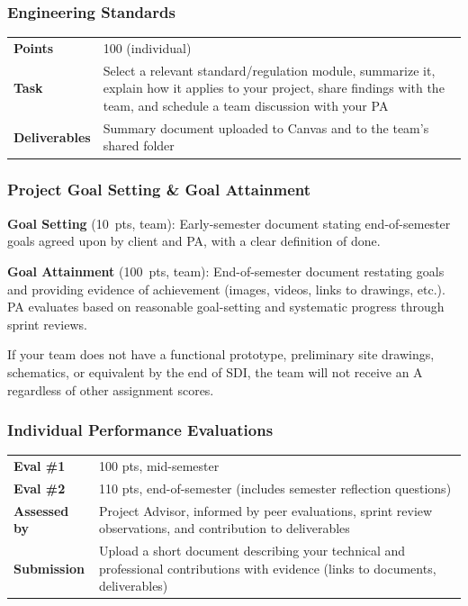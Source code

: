 \subsubsection{Engineering Standards}
\label{sssec:eng-standards}

\begin{tabularx}{\textwidth}{lX}
\toprule
\textbf{Points} & 100 (individual) \\
\textbf{Task} & Select a relevant standard/regulation module, summarize it, explain how it applies to your project, share findings with the team, and schedule a team discussion with your PA \\
\textbf{Deliverables} & Summary document uploaded to Canvas and to the team's shared folder \\
\bottomrule
\end{tabularx}

\subsubsection{Project Goal Setting \& Goal Attainment}
\label{sssec:goals}

\textbf{Goal Setting} (10~pts, team): Early-semester document stating end-of-semester goals agreed upon by client and PA, with a clear definition of done.

\textbf{Goal Attainment} (100~pts, team): End-of-semester document restating goals and providing evidence of achievement (images, videos, links to drawings, etc.). PA evaluates based on reasonable goal-setting and systematic progress through sprint reviews.

\begin{warnbox}
If your team does not have a functional prototype, preliminary site drawings, schematics, or equivalent by the end of SDI, the team will not receive an A regardless of other assignment scores.
\end{warnbox}

\subsubsection{Individual Performance Evaluations}
\label{sssec:ipe-sdi}

\begin{tabularx}{\textwidth}{lX}
\toprule
\textbf{Eval \#1} & 100 pts, mid-semester \\
\textbf{Eval \#2} & 110 pts, end-of-semester (includes semester reflection questions) \\
\textbf{Assessed by} & Project Advisor, informed by peer evaluations, sprint review observations, and contribution to deliverables \\
\textbf{Submission} & Upload a short document describing your technical and professional contributions with evidence (links to documents, deliverables) \\
\bottomrule
\end{tabularx}


